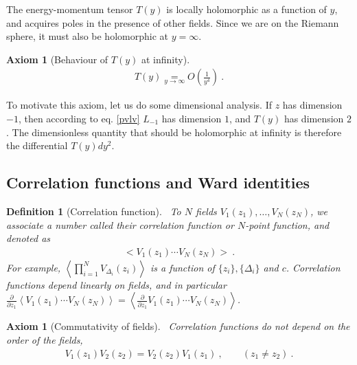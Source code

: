 \documentclass[12pt, a4paper]{article}
\theoremstyle{break}
\newtheorem{hyp}[exo]{Axiom}
\newtheorem{defn}[exo]{Definition}
\begin{document}
The energy-momentum tensor $T(y)$ is locally holomorphic as a function of $y$, and acquires poles in the presence of other fields. Since we are on the Riemann sphere, it must also be holomorphic at $y=\infty$. 

\begin{hyp}[Behaviour of $T(y)$ at infinity]
~\label{hyp:ti}
 \begin{align}
 T(y) \underset{y\to\infty} = O\left(\frac{1}{y^4}\right)\ .
 \label{eq:tinf}
\end{align}
\end{hyp}

To motivate this axiom, let us do some dimensional analysis. If $z$ has dimension $-1$, then according to eq. \eqref{pvlv} $L_{-1}$ has dimension $1$, and $T(y)$ has dimension $2$. The dimensionless quantity that should be holomorphic at infinity is therefore the differential $T(y)dy^2$. 


\subsection{Correlation functions and Ward identities}

\begin{defn}[Correlation function]
~\label{def:cor}
 To $N$ fields $V_1(z_1), \dots ,V_N(z_N)$, we associate a number called their correlation function or $N$-point function, and denoted as 
 \begin{align}
  \Big< V_1(z_1) \cdots V_N(z_N) \Big>\ .
 \end{align}
For example, $\left< \prod_{i=1}^N V_{\Delta_i}(z_i) \right>$ is a function of $\{z_i\}, \{\Delta_i\}$ and $c$.
Correlation functions depend linearly on fields, and in particular $\frac{\partial}{\partial z_1} \left< V_1(z_1) \cdots V_N(z_N) \right> = \left< \frac{\partial}{\partial z_1}V_1(z_1) \cdots V_N(z_N) \right>$.
\end{defn}

\begin{hyp}[Commutativity of fields]
 ~\label{hyp:ass}
 Correlation functions do not depend on the order of the fields,
 \begin{align}
  V_1(z_1) V_2(z_2) = V_2(z_2)V_1(z_1)\ , \qquad (z_1\neq z_2)\ .
 \end{align}
\end{hyp}
\end{document}
